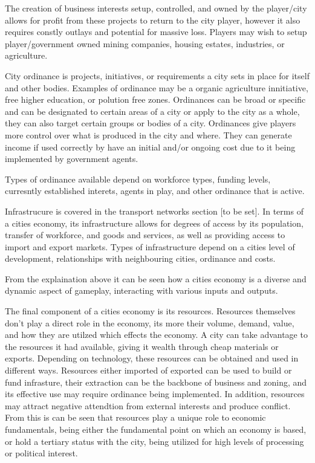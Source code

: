 The creation of business interests setup, controlled, and owned by the player/city allows for profit from these projects to return to the city player, however it also requires constly outlays and potential for massive loss. Players may wish to setup player/government owned mining companies, housing estates, industries, or agriculture. 



City ordinance is projects, initiatives, or requirements a city sets in place for itself and other bodies. Examples of ordinance may be a organic agriculture innitiative, free higher education, or polution free zones. Ordinances can be broad or specific and can be designated to certain areas of a city or apply to the city as a whole, they can also target certain groups or bodies of a city. Ordinances give players more control over what is produced in the city and where. They can generate income if used correctly by have an initial and/or ongoing cost due to it being implemented by government agents.

Types of ordinance available depend on workforce types, funding levels, curresntly established interets, agents in play, and other ordinance that is active. 




Infrastrucure is covered in the transport networks section [to be set]. In terms of a cities economy, its infrastructure allows for degrees of access by its population, transfer of workforce, and goods and services, as well as providing access to import and export markets. Types of infrastructure depend on a cities level of development, relationships with neighbouring cities, ordinance and costs. 


From the explaination above it can be seen how a cities economy is a diverse and dynamic aspect of gameplay, interacting with various inputs and outputs. 





The final component of a cities economy is its resources. Resources themselves don't play a direct role in the economy, its more their volume, demand, value, and how they are utilzed which effects the economy. A city can take advantage to the resources it had available, giving it wealth through cheap materials or exports. Depending on technology, these resources can be obtained and used in different ways. Resources either imported of exported can be used to build or fund infrasture, their extraction can be the backbone of business and zoning, and its effective use may require ordinance being implemented. In addition, resources may attract negative attendtion from external interests and produce conflict. From this is can be seen that resources play a unique role to economic fundamentals, being either the fundamental point on which an economy is based, or hold a tertiary status with the city, being utilized for high levels of processing or political interest.




